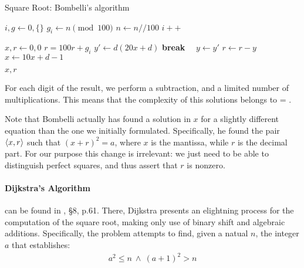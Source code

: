 \begin{algorithm}[H]
  \caption{Square Root: Bombelli's algorithm}
  \label{alg:sqrt:bombelli}
  \begin{algorithmic}[1]

    \State $i, g \gets 0, \{\}$
      \State $g_i \gets n \pmod{100}$
      \State $n \gets n // 100$
      \State $i++$
    \EndWhile

    \State $x, r \gets 0, 0$
      \State $r = 100r + g_i$
        \State $y' \gets d(20x + d)$
          \textbf{break}
        \Else  \ \ $y \gets y'$
        \EndIf
      \EndFor
      \State $r \gets r - y$
      \State $x \gets 10x + d - 1$
    \EndFor

    \State \Return $x, r$

    \EndProcedure
  \end{algorithmic}
\end{algorithm}

For each digit of the result, we perform a subtraction, and a limited number of
multiplications. This means that the complexity of this solutions belongs to
 = .

\begin{remark}
  Note that Bombelli actually has found a solution in $x$ for a slightly
  different equation than the one we initially formulated. Specifically, he
  found the pair $\langle x, r\rangle$ such that $(x+r)^2=a$, where $x$ is the mantissa,
  while $r$ is the decimal part. For our purpose this change is irrelevant: we
  just need to be able to distinguish perfect squares, and thus assert that $r$
  is nonzero.
\end{remark}

\paragraph{Dijkstra's Algorithm \label{par:preq:sqrt:dijkstra}} can be found in
\cite{Dijkstra:adop}, \S 8, p.61. There, Dijkstra presents an elightning
process for the computation of the square root, making only use of binary shift
and algebraic additions.
Specifically, the problem attempts to find, given a natual $n$, the integer $a$
that establishes:
\begin{align}
  \label{eq:preq:dijkstra_problem}
  a^2 \leq n \: \land \: (a+1)^2 > n
\end{align}

